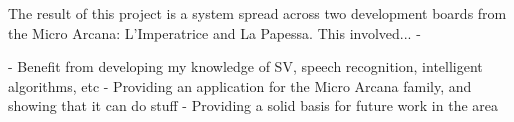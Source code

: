 	The result of this project is a system spread across two development boards from the Micro Arcana: L'Imperatrice and La Papessa.  
	This involved...
		- 

		- Benefit from developing my knowledge of SV, speech recognition, intelligent algorithms, etc
		- Providing an application for the Micro Arcana family, and showing that it can do stuff
		- Providing a solid basis for future work in the area



